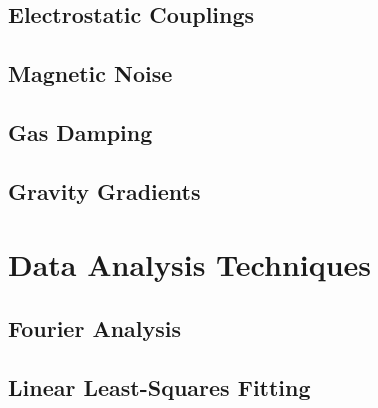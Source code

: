\documentclass{book}
\begin{document}
\section{Electrostatic Couplings}\label{elect}
\section{Magnetic Noise}
\section{Gas Damping} \label{gas}
\section{Gravity Gradients}\label{gravGrad}

\chapter{Data Analysis Techniques}
\section{Fourier Analysis}
\section{Linear Least-Squares Fitting}



\end{document}
